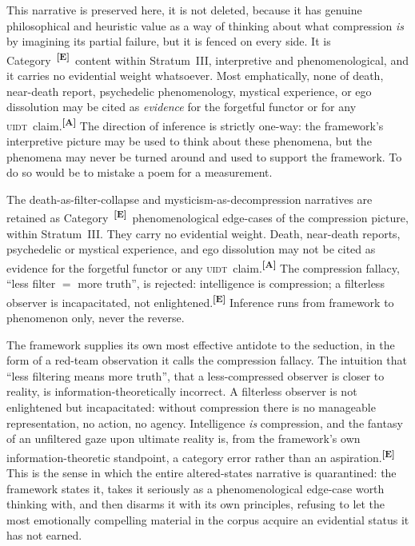 \documentclass[12pt,a4paper,twoside]{article}
\theoremstyle{plain}
\theoremstyle{definition}
\theoremstyle{remark}
\newcommand{\UIDT}{\textsc{uidt}}
\newcommand{\catmark}[1]{\textsuperscript{\textsf{\textbf{[#1]}}}}
\begin{document}
This narrative is preserved here, it is not deleted, because it has genuine philosophical and heuristic value as a way of thinking about what compression \emph{is} by imagining its partial failure, but it is fenced on every side. It is Category~\catmark{E}\ content within Stratum~III, interpretive and phenomenological, and it carries no evidential weight whatsoever. Most emphatically, none of death, near-death report, psychedelic phenomenology, mystical experience, or ego dissolution may be cited as \emph{evidence} for the forgetful functor or for any \UIDT\ claim.\catmark{A} The direction of inference is strictly one-way: the framework's interpretive picture may be used to think about these phenomena, but the phenomena may never be turned around and used to support the framework. To do so would be to mistake a poem for a measurement.

\begin{governancebox}
The death-as-filter-collapse and mysticism-as-decompression narratives are retained as Category~\catmark{E}\ phenomenological edge-cases of the compression picture, within Stratum~III. They carry no evidential weight. Death, near-death reports, psychedelic or mystical experience, and ego dissolution may not be cited as evidence for the forgetful functor or any \UIDT\ claim.\catmark{A} The compression fallacy, ``less filter $=$ more truth'', is rejected: intelligence is compression; a filterless observer is incapacitated, not enlightened.\catmark{E} Inference runs from framework to phenomenon only, never the reverse.
\end{governancebox}
The framework supplies its own most effective antidote to the seduction, in the form of a red-team observation it calls the compression fallacy. The intuition that ``less filtering means more truth'', that a less-compressed observer is closer to reality, is information-theoretically incorrect. A filterless observer is not enlightened but incapacitated: without compression there is no manageable representation, no action, no agency. Intelligence \emph{is} compression, and the fantasy of an unfiltered gaze upon ultimate reality is, from the framework's own information-theoretic standpoint, a category error rather than an aspiration.\catmark{E} This is the sense in which the entire altered-states narrative is quarantined: the framework states it, takes it seriously as a phenomenological edge-case worth thinking with, and then disarms it with its own principles, refusing to let the most emotionally compelling material in the corpus acquire an evidential status it has not earned.
\end{document}
